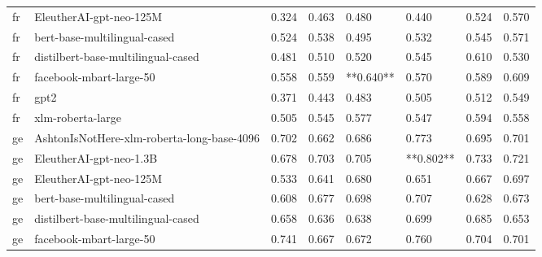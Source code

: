 \begin{tabular}{llllllll}
      fr &                    EleutherAI-gpt-neo-125M & 0.324 &                     0.463 &                 0.480 &                  0.440 &                                   0.524 &    0.570 \\
      fr &               bert-base-multilingual-cased & 0.524 &                     0.538 &                 0.495 &                  0.532 &                                   0.545 &    0.571 \\
      fr &         distilbert-base-multilingual-cased & 0.481 &                     0.510 &                 0.520 &                  0.545 &                                   0.610 &    0.530 \\
      fr &                    facebook-mbart-large-50 & 0.558 &                     0.559 &             **0.640** &                  0.570 &                                   0.589 &    0.609 \\
      fr &                                       gpt2 & 0.371 &                     0.443 &                 0.483 &                  0.505 &                                   0.512 &    0.549 \\
      fr &                          xlm-roberta-large & 0.505 &                     0.545 &                 0.577 &                  0.547 &                                   0.594 &    0.558 \\
      ge & AshtonIsNotHere-xlm-roberta-long-base-4096 & 0.702 &                     0.662 &                 0.686 &                  0.773 &                                   0.695 &    0.701 \\
      ge &                    EleutherAI-gpt-neo-1.3B & 0.678 &                     0.703 &                 0.705 &              **0.802** &                                   0.733 &    0.721 \\
      ge &                    EleutherAI-gpt-neo-125M & 0.533 &                     0.641 &                 0.680 &                  0.651 &                                   0.667 &    0.697 \\
      ge &               bert-base-multilingual-cased & 0.608 &                     0.677 &                 0.698 &                  0.707 &                                   0.628 &    0.673 \\
      ge &         distilbert-base-multilingual-cased & 0.658 &                     0.636 &                 0.638 &                  0.699 &                                   0.685 &    0.653 \\
      ge &                    facebook-mbart-large-50 & 0.741 &                     0.667 &                 0.672 &                  0.760 &                                   0.704 &    0.701 \\

\end{tabular}
